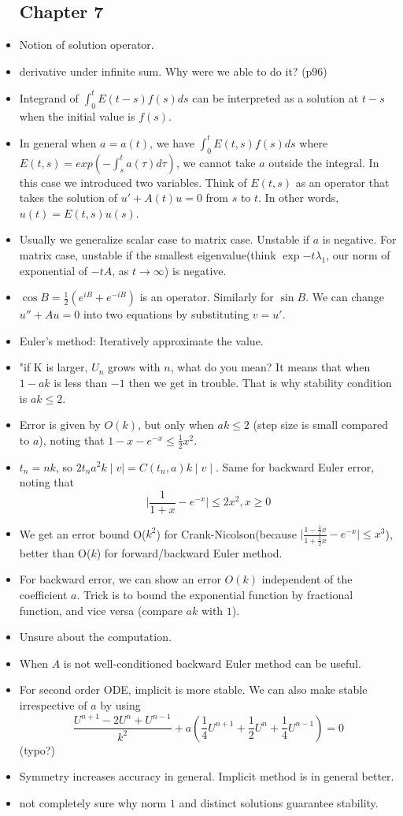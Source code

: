 \documentclass{article}
\theoremstyle{remark}
\begin{document}
\begin{itemize}
           \subsection*{Chapter 7}
        \item Notion of solution operator.
        \item derivative under infinite sum. Why were we able to do it? (p96)
        \item Integrand of $\int ^t_0 E(t-s)f(s)ds$ can be interpreted as a solution at $t-s$ when the initial value is $f(s)$.
        \item In general when $a=a(t)$, we have $\int^t_0 E(t,s)f(s)ds$ where $E(t,s)=exp(-\int^t_s a(\tau)d\tau)$, we cannot take $a$ outside the integral. In this case we introduced two variables. Think of $E(t,s)$ as an operator that takes the solution of $u'+A(t)u=0$ from $s$ to $t$. In other words, $u(t)=E(t,s)u(s)$.
        \item Usually we generalize scalar case to matrix case. Unstable if $a$ is negative. For matrix case, unstable if the smallest eigenvalue(think $\exp{-t\lambda_1}$, our norm of exponential of $-tA$, as $t\to\infty$) is negative. 
        \item $\cos B=\frac 12(e^{iB}+e^{-iB})$ is an operator. Similarly for $\sin B$. We can change $u''+Au=0$ into two equations by substituting $v=u'$.
        \item Euler's method: Iteratively approximate the value.
        \item "if K is larger, $U_n$ grows with $n$, what do you mean? It means that when $1-ak$ is less than $-1$ then we get in trouble. That is why stability condition is $ak\leq 2$.
        \item Error is given by $O(k)$, but only when $ak\leq 2$ (step size is small compared to $a$), noting that $1-x-e^{-x}\leq \frac12x^2$.
        \item $t_n=nk$, so $2t_na^2k\mid v\mid=C(t_n,a)k\mid v\mid$. Same for backward Euler error, noting that $$\mid\frac1{1+x}-e^{-x}\mid\leq 2x^2, x\geq 0$$
        \item We get an error bound O($k^2$) for Crank-Nicolson(because $\mid\frac{1-\frac12x}{1+\frac12x}-e^{-x}\mid\leq x^3$), better than O($k$) for forward/backward Euler method.
        \item For backward error, we can show an error $O(k)$ independent of the coefficient $a$. Trick is to bound the exponential function by fractional function, and vice versa (compare $ak$ with $1$).
        \item Unsure about the computation.
        \item When $A$ is not well-conditioned backward Euler method can be useful. 
        \item For second order ODE, implicit is more stable. We can also make stable irrespective of $a$ by using $$\frac{U^{n+1}-2U^n+U^{n-1}}{k^2}+a(\frac 14 U^{n+1}+\frac 12U^n+\frac 14U^{n-1})=0$$(typo?) 
        \item Symmetry increases accuracy in general. Implicit method is in general better.
        \item not completely sure why norm $1$ and distinct solutions guarantee stability.


\end{itemize}
\end{document}
